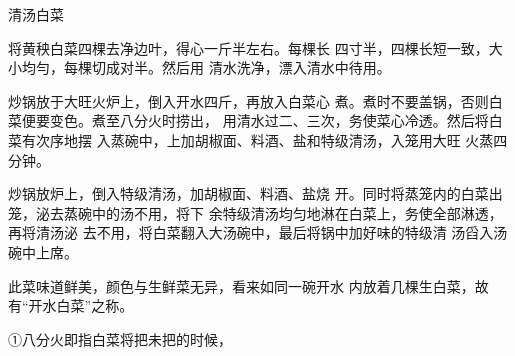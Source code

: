 \begin{recipe}[名开水白菜]{清汤白菜}

\ingredients


\cooking

\step 	将黄秧白菜四棵去净边叶，得心一斤半左右。每棵长 四寸半，四棵长短一致，大小均勻，每棵切成对半。然后用 清水洗净，漂入清水中待用。

\step 	炒锅放于大旺火炉上，倒入开水四斤，再放入白菜心 煮。煮时不要盖锅，否则白菜便要变色。煮至八分火时捞出， 用清水过二、三次，务使菜心冷透。然后将白菜有次序地摆 入蒸碗中，上加胡椒面、料酒、盐和特级清汤，入笼用大旺 火蒸四分钟。

\step 炒锅放炉上，倒入特级清汤，加胡椒面、料酒、盐烧 开。同时将蒸笼内的白菜出笼，泌去蒸碗中的汤不用，将下 余特级清汤均匀地淋在白菜上，务使全部淋透，再将清汤泌 去不用，将白菜翻入大汤碗中，最后将锅中加好味的特级清 汤舀入汤碗中上席。

\notes

此菜味道鲜美，颜色与生鲜菜无异，看来如同一碗开水 内放着几棵生白菜，故有“开水白菜”之称。

①八分火即指白菜将把未把的时候，

\end{recipe}

